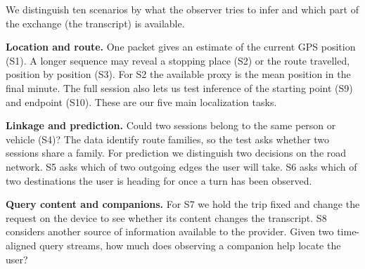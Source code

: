 We distinguish ten scenarios by what the observer tries to infer and which
part of the exchange (the transcript) is available.

\smallskip\noindent\textbf{Location and route.}
One packet gives an estimate of the current GPS position (S1). A longer
sequence may reveal a stopping place (S2) or the route travelled, position by
position (S3). For S2 the available proxy is the mean position in the final
minute. The full session also lets us test inference of the starting point
(S9) and endpoint (S10). These are our five main localization tasks.

\smallskip\noindent\textbf{Linkage and prediction.}
Could two sessions belong to the same person or vehicle (S4)? The data
identify route families, so the test asks whether two sessions share a
family. For prediction we distinguish two decisions on the road network.
S5 asks which of two outgoing edges the user will take. S6 asks which of
two destinations the user is heading for once a turn has been observed.

\smallskip\noindent\textbf{Query content and companions.}
For S7 we hold the trip fixed and change the request on the device to see
whether its content changes the transcript. S8 considers another source of
information available to the provider. Given two time-aligned query streams,
how much does observing a companion help locate the user?
